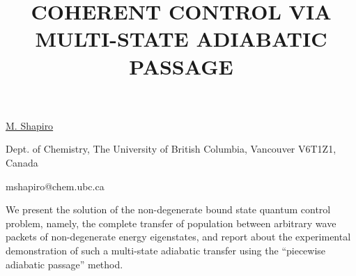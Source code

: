 \title{COHERENT CONTROL VIA MULTI-STATE ADIABATIC \mbox{PASSAGE}}

\underline{M. Shapiro} 

{\normalsize{\vspace{-4mm}
Dept. of Chemistry, The University of British Columbia, Vancouver
V6T1Z1, Canada

\email mshapiro@chem.ubc.ca}}

We present the solution of the non-degenerate bound state quantum
control problem, namely, the complete transfer of population between
arbitrary wave packets of non-degenerate energy eigenstates, and
report about the experimental demonstration of such a multi-state
adiabatic transfer using the ``piecewise adiabatic passage'' method.

\vspace{\baselineskip}
